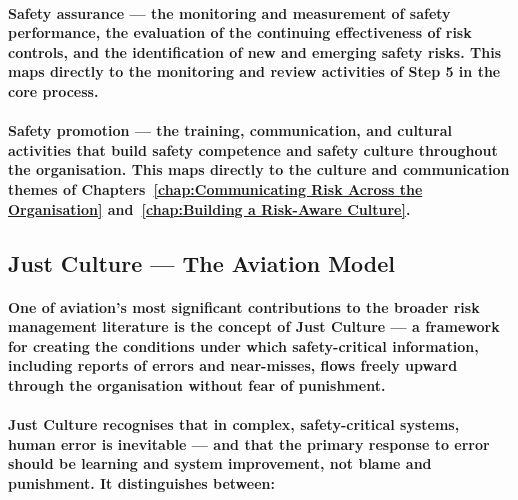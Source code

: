 \paragraph{\textbf{Safety assurance} — the monitoring and measurement of safety performance, the evaluation of the continuing effectiveness of risk controls, and the identification of new and emerging safety risks. This maps directly to the monitoring and review activities of Step 5 in the core process.}
\paragraph{Safety promotion — the training, communication, and cultural activities that build safety competence and safety culture throughout the organisation. This maps directly to the culture and communication themes of Chapters~\ref{chap:Communicating Risk Across the Organisation} and~\ref{chap:Building a Risk-Aware Culture}.}

\subsection{Just Culture — The Aviation Model}
\paragraph{One of aviation's most significant contributions to the broader risk management literature is the concept of \textbf{Just Culture} — a framework for creating the conditions under which safety-critical information, including reports of errors and near-misses, flows freely upward through the organisation without fear of punishment.}
\paragraph{Just Culture recognises that in complex, safety-critical systems, human error is inevitable — and that the primary response to error should be learning and system improvement, not blame and punishment. It distinguishes between:}
\begin{itemize}
\end{itemize}
